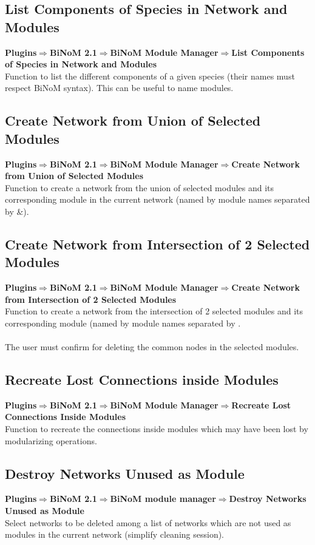 \subsection{List Components of Species in Network and Modules}
\textbf{Plugins$\Rightarrow$BiNoM 2.1$\Rightarrow$BiNoM Module Manager$\Rightarrow$List Components of Species in Network and Modules}\\
Function to list the different components of a given species (their names must respect BiNoM syntax). This can be useful to name modules.

\subsection{Create Network from Union of Selected Modules}
\textbf{Plugins$\Rightarrow$BiNoM 2.1$\Rightarrow$BiNoM Module Manager$\Rightarrow$Create Network from Union of Selected Modules}\\
Function to create a network from the union of selected modules and its corresponding module in the current network (named by module names separated by \&).

\subsection{Create Network from Intersection of 2 Selected Modules}
\textbf{Plugins$\Rightarrow$BiNoM 2.1$\Rightarrow$BiNoM Module Manager$\Rightarrow$Create Network from Intersection of 2 Selected Modules}\\
Function to create a network from the intersection of 2 selected modules and its corresponding module (named by module names separated by \textbar.\\\\
The user must confirm for deleting the common nodes in the selected modules.

\subsection{Recreate Lost Connections inside Modules}
\textbf{Plugins$\Rightarrow$BiNoM 2.1$\Rightarrow$BiNoM Module Manager$\Rightarrow$Recreate Lost Connections Inside Modules}\\
Function to recreate the connections inside modules which may have been lost by modularizing operations.

\subsection{Destroy Networks Unused as Module}
\textbf{Plugins$\Rightarrow$BiNoM 2.1$\Rightarrow$BiNoM module manager$\Rightarrow$Destroy Networks Unused as Module}\\
Select networks to be deleted among a list of networks which are not used as modules in the current network (simplify cleaning session).
